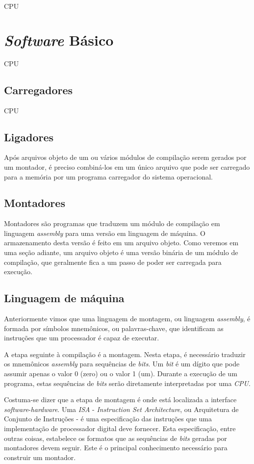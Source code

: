 CPU

\section{\textit{Software} Básico}

CPU

\subsection{Carregadores}

CPU

\subsection{Ligadores}

Após arquivos objeto de um ou vários módulos de compilação serem gerados por um montador, é preciso combiná-los em um único arquivo que pode ser carregado para a memória por um programa carregador do sistema operacional.

\subsection{Montadores}

Montadores são programas que traduzem um módulo de compilação em linguagem \textit{assembly} para uma versão em linguagem de máquina. O armazenamento desta versão é feito em um arquivo objeto. Como veremos em uma seção adiante, um arquivo objeto é uma versão binária de um módulo de compilação, que geralmente fica a um passo de poder ser carregada para execução.

\subsection{Linguagem de máquina}

Anteriormente vimos que uma linguagem de montagem, ou linguagem \textit{assembly}, é formada por símbolos mnemônicos, ou palavras-chave, que identificam as instruções que um processador é capaz de executar.

A etapa seguinte à compilação é a montagem. Nesta etapa, é necessário traduzir os mnemônicos \textit{assembly} para sequências de \textit{bits}. Um \textit{bit} é um dígito que pode assumir apenas o valor 0 (zero) ou o valor 1 (um). Durante a execução de um programa, estas sequências de \textit{bits} serão diretamente interpretadas por uma \textit{CPU}.

Costuma-se dizer que a etapa de montagem é onde está localizada a interface \textit{software}-\textit{hardware}. Uma \textit{ISA} - \textit{Instruction Set Architecture}, ou Arquitetura de Conjunto de Instruções - é uma especificação das instruções que uma implementação de processador digital deve fornecer. Esta especificação, entre outras coisas, estabelece os formatos que as sequências de \textit{bits} geradas por montadores devem seguir. Este é o principal conhecimento necessário para construir um montador.

